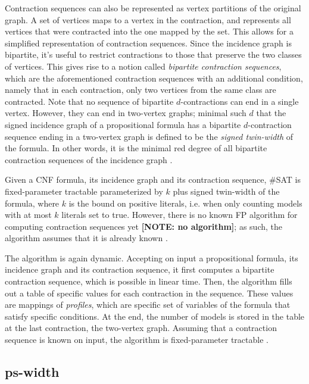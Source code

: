 \documentclass{article}
\begin{document}
Contraction sequences can also be represented as vertex partitions of the original graph.
A set of vertices maps to a vertex in the contraction, and represents all vertices that were contracted into the one mapped by the set.
This allows for a simplified representation of contraction sequences.
Since the incidence graph is bipartite, it's useful to restrict contractions to those that preserve the two classes of vertices.
This gives rise to a notion called {\em bipartite contraction sequences}, which are the aforementioned contraction sequences with an additional condition, namely that in each contraction, only two vertices from the same class are contracted.
Note that no sequence of bipartite $d$-contractions can end in a single vertex.
However, they can end in two-vertex graphs; minimal such $d$ that the signed incidence graph of a propositional formula has a bipartite $d$-contraction sequence ending in a two-vertex graph is defined to be the {\em signed twin-width} of the formula. In other words, it is the minimal red degree of all bipartite contraction sequences of the incidence graph \cite{DBLP:conf/sat/GanianPSSS22}.

Given a CNF formula, its incidence graph and its contraction sequence, \#SAT is fixed-parameter tractable parameterized by $k$ plus signed twin-width of the formula, where $k$ is the bound on positive literals, i.e. when only counting models with at most $k$ literals set to true.
However, there is no known FP algorithm for computing contraction sequences yet \textbf{[NOTE: no algorithm]}; as such, the algorithm assumes that it is already known \cite{DBLP:conf/sat/GanianPSSS22}.

The algorithm is again dynamic.
Accepting on input a propositional formula, its incidence graph and its contraction sequence, it first computes a bipartite contraction sequence, which is possible in linear time.
Then, the algorithm fills out a table of specific values for each contraction in the sequence.
These values are mappings of {\em profiles}, which are specific set of variables of the formula that satisfy specific conditions.
At the end, the number of models is stored in the table at the last contraction, the two-vertex graph.
Assuming that a contraction sequence is known on input, the algorithm is fixed-parameter tractable \cite{DBLP:conf/sat/GanianPSSS22}.

\subsection{ps-width}
\end{document}
